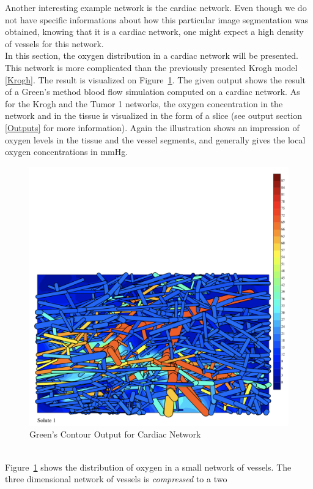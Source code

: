 Another interesting example network is the cardiac network. Even though we do not have specific informations about how this particular image segmentation was obtained, knowing that it is a cardiac network, one might expect a high density of vessels for this network.
\\In this section, the oxygen distribution in a cardiac network will be presented. This network is more complicated than the previously presented Krogh model \ref{Krogh}. The result is visualized on Figure~\ref{fig:Contour_Cardiac1}. The given output shows the result of a Green's method blood flow simulation computed on a cardiac network. As for the Krogh and the Tumor 1 networks, the oxygen concentration in the network and in the tissue is visualized in the form of a slice (see output section \ref{Outputs} for more information). Again the illustration shows an impression of oxygen levels in the tissue and the vessel segments, and generally gives the local oxygen concentrations in mmHg.\\
\begin{figure}[h]
\centering
\includegraphics[width=120mm]{Contour_Cardiac}
\caption{\footnotesize Green's Contour Output for Cardiac Network}
\label{fig:Contour_Cardiac1}
\end{figure}
\\Figure~\ref{fig:Contour_Cardiac1} shows the distribution of oxygen in a small
network of vessels.
The three dimensional network of vessels is \emph{compressed} to a two
